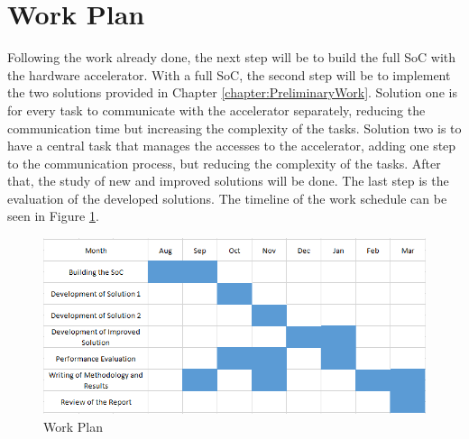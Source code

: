 


\section{Work Plan}
\label{section:future}
Following the work already done, the next step will be to build the full SoC with the hardware accelerator. With a full SoC, the second step will be to implement the two solutions provided in Chapter \ref{chapter:PreliminaryWork}. Solution one is for every task to communicate with the accelerator separately, reducing the communication time but increasing the complexity of the tasks. Solution two is to have a central task that manages the accesses to the accelerator, adding one step to the communication process, but reducing the complexity of the tasks. After that, the study of new and improved solutions will be done. The last step is the evaluation of the developed solutions. The timeline of the work schedule can be seen in Figure \ref{fig:workplan}.

\begin{figure}[H]
    \centering
    \includegraphics[scale=0.7]{Figures/workplan.png}
    \caption{Work Plan}
    \label{fig:workplan}
\end{figure}
